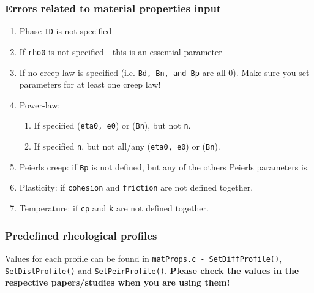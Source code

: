 \documentclass[a4paper,11pt]{article}
\begin{document}
\subsubsection{Errors related to material properties input}
\begin{enumerate}
\item Phase \texttt{ID} is not specified
\item If \texttt{rho0} is not specified - this is an essential parameter
\item If no creep law is specified (i.e. \texttt{Bd, Bn, and Bp} are all 0). Make sure you set parameters for at least one creep law!
\item Power-law: 
	\begin{enumerate}
	\item If specified (\texttt{eta0, e0}) or (\texttt{Bn}), but not \texttt{n}.
	\item If specified \texttt{n}, but not all/any (\texttt{eta0, e0}) or (\texttt{Bn}).
	\end{enumerate}
\item Peierls creep: if \texttt{Bp} is not defined, but any of the others Peierls parameters is.
\item Plasticity: if \texttt{cohesion} and \texttt{friction} are not defined together.
\item Temperature: if \texttt{cp} and \texttt{k} are not defined together.
\end{enumerate}

\subsubsection{Predefined rheological profiles}
\label{sec:predefined}

Values for each profile can be found in \texttt{matProps.c - SetDiffProfile()}, \texttt{SetDislProfile()} and \texttt{SetPeirProfile()}. \textbf{Please check the values in the respective papers/studies when you are using them!}
\end{document}
